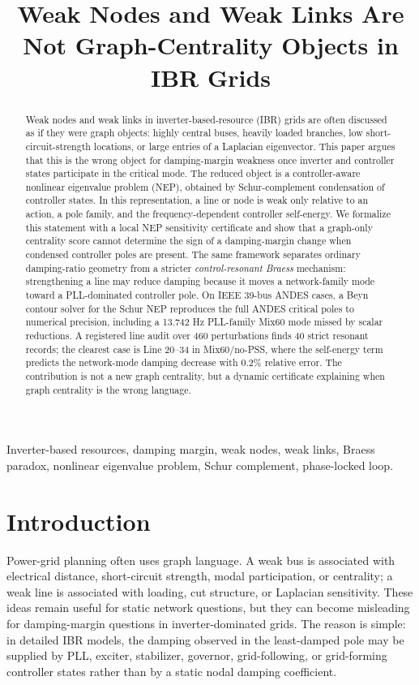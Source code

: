 \documentclass[conference]{IEEEtran}
\title{Weak Nodes and Weak Links Are Not Graph-Centrality Objects in IBR Grids}
\author{
\IEEEauthorblockN{Jorge L. Mayorga Taborda}
\IEEEauthorblockA{Universidad de los Andes, Bogota, Colombia\\
Email: author@example.com}
}
\begin{document}
\maketitle

\begin{abstract}
Weak nodes and weak links in inverter-based-resource (IBR) grids are often discussed as if they were graph objects: highly central buses, heavily loaded branches, low short-circuit-strength locations, or large entries of a Laplacian eigenvector. This paper argues that this is the wrong object for damping-margin weakness once inverter and controller states participate in the critical mode. The reduced object is a controller-aware nonlinear eigenvalue problem (NEP), obtained by Schur-complement condensation of controller states. In this representation, a line or node is weak only relative to an action, a pole family, and the frequency-dependent controller self-energy. We formalize this statement with a local NEP sensitivity certificate and show that a graph-only centrality score cannot determine the sign of a damping-margin change when condensed controller poles are present. The same framework separates ordinary damping-ratio geometry from a stricter \emph{control-resonant Braess} mechanism: strengthening a line may reduce damping because it moves a network-family mode toward a PLL-dominated controller pole. On IEEE 39-bus ANDES cases, a Beyn contour solver for the Schur NEP reproduces the full ANDES critical poles to numerical precision, including a 13.742 Hz PLL-family Mix60 mode missed by scalar reductions. A registered line audit over 460 perturbations finds 40 strict resonant records; the clearest case is Line 20--34 in Mix60/no-PSS, where the self-energy term predicts the network-mode damping decrease with 0.2\% relative error. The contribution is not a new graph centrality, but a dynamic certificate explaining when graph centrality is the wrong language.
\end{abstract}

\begin{IEEEkeywords}
Inverter-based resources, damping margin, weak nodes, weak links, Braess paradox, nonlinear eigenvalue problem, Schur complement, phase-locked loop.
\end{IEEEkeywords}

\section{Introduction}

Power-grid planning often uses graph language. A weak bus is associated with electrical distance, short-circuit strength, modal participation, or centrality; a weak line is associated with loading, cut structure, or Laplacian sensitivity. These ideas remain useful for static network questions, but they can become misleading for damping-margin questions in inverter-dominated grids. The reason is simple: in detailed IBR models, the damping observed in the least-damped pole may be supplied by PLL, exciter, stabilizer, governor, grid-following, or grid-forming controller states rather than by a static nodal damping coefficient.
\end{document}

